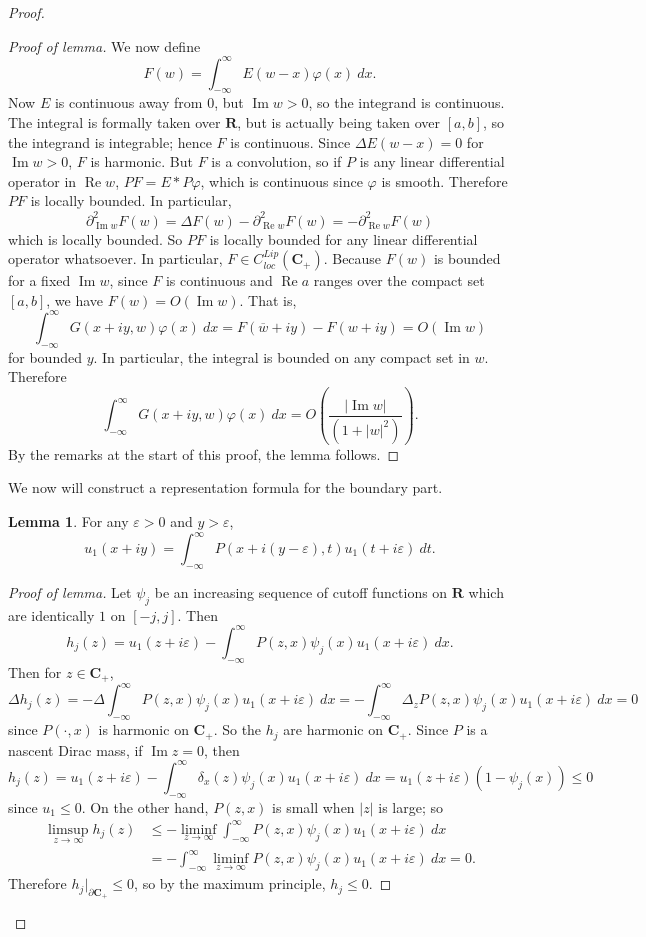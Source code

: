 \documentclass[12pt]{report}
\newcommand{\RR}{\mathbf{R}}
\newcommand{\CC}{\mathbf{C}}
\renewcommand{\Re}{\operatorname{Re}}
\renewcommand{\Im}{\operatorname{Im}}
\theoremstyle{definition}
\newtheorem{lemma}[theorem]{Lemma}
\begin{document}
\begin{proof}
\begin{proof}[Proof of lemma]
    We now define
$$F(w) = \int_{-\infty}^\infty E(w - x)\varphi(x) ~dx.$$
    Now $E$ is continuous away from $0$, but $\Im w > 0$, so the integrand is continuous. The integral is formally taken over $\RR$, but is actually being taken over $[a, b]$, so the integrand is integrable; hence $F$ is continuous. Since $\Delta E(w - x) = 0$ for $\Im w > 0$, $F$ is harmonic. But $F$ is a convolution, so if $P$ is any linear differential operator in $\Re w$, $PF = E * P\varphi$, which is continuous since $\varphi$ is smooth. Therefore $PF$ is locally bounded. In particular,
$$\partial_{\Im w}^2 F(w) = \Delta F(w) - \partial_{\Re w}^2 F(w) = -\partial_{\Re w}^2 F(w)$$
    which is locally bounded. So $PF$ is locally bounded for any linear differential operator whatsoever. In particular, $F \in C^{Lip}_{loc}(\CC_+)$. Because $F(w)$ is bounded for a fixed $\Im w$, since $F$ is continuous and $\Re a$ ranges over the compact set $[a, b]$, we have $F(w) = O(\Im w)$. That is,
$$\int_{-\infty}^\infty G(x + iy, w) \varphi(x) ~dx = F(\overline w + iy) - F(w + iy) = O(\Im w)$$
    for bounded $y$. In particular, the integral is bounded on any compact set in $w$. Therefore
$$\int_{-\infty}^\infty G(x + iy, w) \varphi(x) ~dx = O\left(\frac{|\Im w|}{(1 + |w|^2)}\right).$$
    By the remarks at the start of this proof, the lemma follows.
\end{proof}
    We now will construct a representation formula for the boundary part.
\begin{lemma}
  \label{approximate sigma rep}
    For any $\varepsilon > 0$ and $y > \varepsilon$,
$$u_1(x + iy) = \int_{-\infty}^\infty P(x + i(y-\varepsilon), t) u_1(t + i\varepsilon) ~dt.$$
\end{lemma}
\begin{proof}[Proof of lemma]
    Let $\psi_j$ be an increasing sequence of cutoff functions on $\RR$ which are identically $1$ on $[-j, j]$. Then
$$h_j(z) = u_1(z + i\varepsilon) - \int_{-\infty}^\infty P(z, x)\psi_j(x)u_1(x + i\varepsilon) ~dx.$$
    Then for $z \in \CC_+$,
$$\Delta h_j(z) = -\Delta \int_{-\infty}^\infty P(z, x)\psi_j(x) u_1(x + i\varepsilon) ~dx = -\int_{-\infty}^\infty \Delta_z P(z, x) \psi_j(x) u_1(x + i\varepsilon) ~dx = 0$$
    since $P(\cdot, x)$ is harmonic on $\CC_+$. So the $h_j$ are harmonic on $\CC_+$. Since $P$ is a nascent Dirac mass, if $\Im z = 0$, then
$$h_j(z) = u_1(z + i\varepsilon) - \int_{-\infty}^\infty \delta_x(z) \psi_j(x) u_1(x + i\varepsilon) ~dx = u_1(z + i\varepsilon)(1 - \psi_j(x)) \leq 0$$
    since $u_1 \leq 0$. On the other hand, $P(z, x)$ is small when $|z|$ is large; so
    \begin{align*}\limsup_{z \to \infty} h_j(z) &\leq -\liminf_{z \to \infty} \int_{-\infty}^\infty P(z, x) \psi_j(x) u_1(x + i\varepsilon) ~dx
      \\&= -\int_{-\infty}^\infty \liminf_{z \to \infty} P(z, x) \psi_j(x) u_1(x + i\varepsilon) ~dx = 0.\end{align*}
    Therefore $h_j|_{\partial \CC_+} \leq 0$, so by the maximum principle, $h_j \leq 0$.


\end{proof}
\end{proof}
\end{document}
